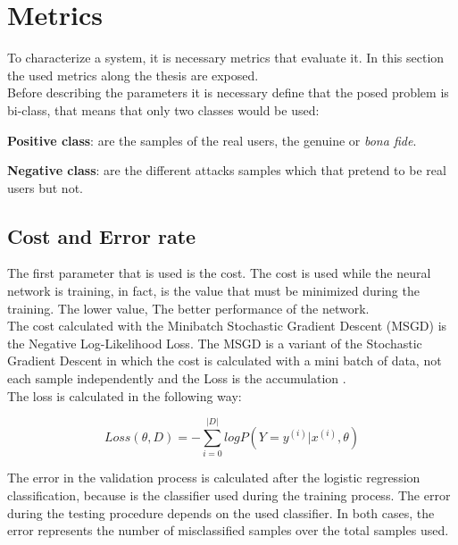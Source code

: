 \section{Metrics}
To characterize a system, it is necessary metrics that evaluate it. In this section the used metrics along the thesis are exposed.\\

Before describing the parameters it is necessary define that the posed problem is bi-class, that means that only two classes would be used:
\begin{description}[itemsep=2pt,topsep=8pt,parsep=0pt,partopsep=20pt]
\item \textbf{Positive class}: are the samples of the real users, the genuine or \textit{bona fide}.
\item \textbf{Negative class}: are the different attacks samples which that pretend to be real users but not.
\end{description}

\subsection{Cost and Error rate}
The first parameter that is used is the cost. The cost is used while the neural network is training, in fact, is the value that must be minimized during the training. The lower value, The better performance of the network.\\

The cost calculated with the Minibatch Stochastic Gradient Descent (MSGD) is the Negative Log-Likelihood Loss. The MSGD is a variant of the Stochastic Gradient Descent in which the cost is calculated with a mini batch of data, not each sample independently and the Loss is the accumulation \cite{Stutz}.\\

The loss is calculated in the following way:

\begin{equation}
  Loss(\theta, D) = - \sum_{i=0}^{|D|}log P(Y = y^{(i)}|x^{(i)}, \theta)
\end{equation}

The error in the validation process is calculated after the logistic regression classification, because is the classifier used during the training process. The error during the testing procedure depends on the used classifier. In both cases, the error represents the number of misclassified samples over the total samples used.

